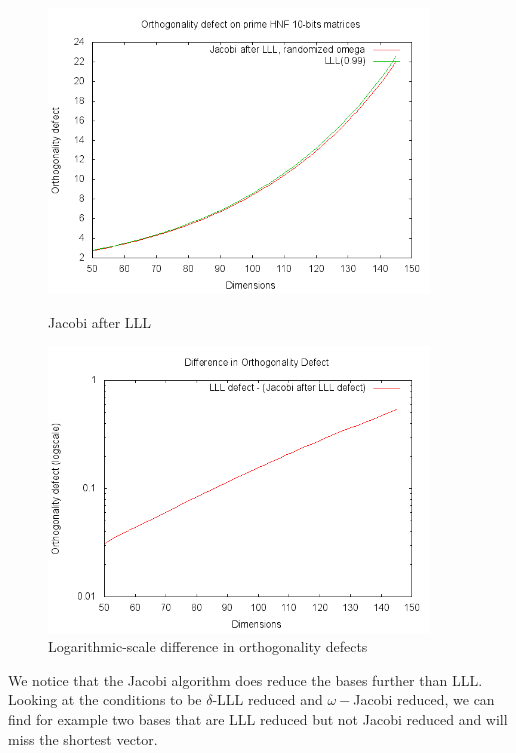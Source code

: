 \documentclass[10pt, a4paper]{article}
\begin{document}
\begin{figure}[H]
\begin{minipage}{.45\textwidth}
  \centering
    \includegraphics[width=0.9\textwidth]{results-graphs/LLLThenJacobi/defect.png}
      \caption{Jacobi after LLL}
  \label{fig4}
\end{minipage}
\hspace{.05\textwidth}
\begin{minipage}{.45\textwidth}

  \centering
    \includegraphics[width=0.9\textwidth]{results-graphs/LLLThenJacobi/defect-logscale-difference.png}
    
  \caption{Logarithmic-scale difference in orthogonality defects}
  \label{fig5}
\end{minipage}
\end{figure}

We notice that the Jacobi algorithm does reduce the bases further than LLL. Looking at the conditions to be $\delta$-LLL reduced and $\omega-$Jacobi reduced, we can find for example two bases that are LLL reduced but not Jacobi reduced and will miss the shortest vector.
\end{document}
